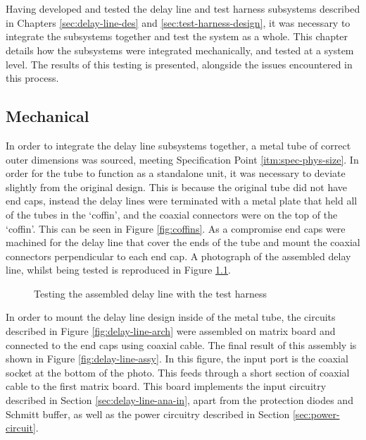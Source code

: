 \chapter{} \label{sec:sys-integration}
Having developed and tested the delay line and test harness subsystems described in Chapters \ref{sec:delay-line-des} and \ref{sec:test-harness-design}, it was necessary to integrate the subsystems together and test the system as a whole. This chapter details how the subsystems were integrated mechanically, and tested at a system level. The results of this testing is presented, alongside the issues encountered in this process.

\section{Mechanical}
In order to integrate the delay line subsystems together, a metal tube of correct outer dimensions was sourced, meeting Specification Point \ref{itm:spec-phys-size}. In order for the tube to function as a standalone unit, it was necessary to deviate slightly from the original design. This is because the original tube did not have end caps, instead the delay lines were terminated with a metal plate that held all of the tubes in the `coffin', and the coaxial connectors were on the top of the `coffin'. This can be seen in Figure \ref{fig:coffins}. As a compromise end caps were machined for the delay line that cover the ends of the tube and mount the coaxial connectors perpendicular to each end cap. A photograph of the assembled delay line, whilst being tested is reproduced in Figure \ref{fig:delay-line-testing}.

\begin{figure}[ht]
	\centering
	\caption{Testing the assembled delay line with the test harness}
	\label{fig:delay-line-testing}
\end{figure}

In order to mount the delay line design inside of the metal tube, the circuits described in Figure \ref{fig:delay-line-arch} were assembled on matrix board and connected to the end caps using coaxial cable. The final result of this assembly is shown in Figure \ref{fig:delay-line-assy}. In this figure, the input port is the coaxial socket at the bottom of the photo. This feeds through a short section of coaxial cable to the first matrix board. This board implements the input circuitry described in Section \ref{sec:delay-line-ana-in}, apart from the protection diodes and Schmitt buffer, as well as the power circuitry described in Section \ref{sec:power-circuit}.

